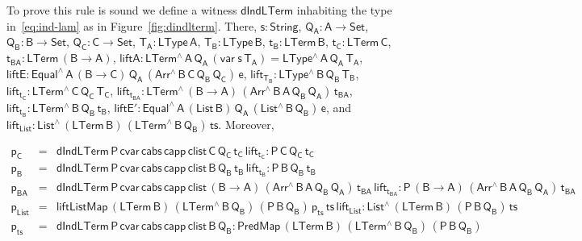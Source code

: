 \documentclass[9pt]{entcs}
\begin{document}
To prove this rule is sound we define a witness
$\mathsf{dIndLTerm}$ inhabiting the type in~\eqref{eq:ind-lam} as in
Figure~\ref{fig:dindlterm}. There, $\mathsf{s : String}$, $\mathsf{Q_A
  : A \to Set}$, $\mathsf{Q_B : B \to Set}$, $\mathsf{Q_C : C \to
  Set}$, $\mathsf{T_A : LType\,A}$, $\mathsf{T_B : LType\,B}$,
$\mathsf{t_B : LTerm\,B}$, $\mathsf{t_C : LTerm\,C}$, $\mathsf{t_{BA}
  : LTerm\,(B \to A)}$, $\mathsf{liftA : LTerm^{\wedge}\, A\,
  Q_A\, (var\;s\,T_A) = LType^{\wedge}\,A\,Q_A\,T_A}$, $\mathsf{liftE
  : Equal^{\wedge} \, A\, (B \to C)\, Q_A\, (Arr^{\wedge} \, B\, C\,
  Q_B \, Q_C) \, e}$, $\mathsf{lift_{T_B}: LType^{\wedge} \, B\, Q_B\,
  T_B}$, $\mathsf{lift_{t_C}: LTerm^{\wedge} \, C\, Q_C\,
  T_C}$, $\mathsf{lift_{t_{BA}}: LTerm^{\wedge} \, (B \to A)\,
  (Arr^{\wedge} \, B\, A\, Q_B \, Q_A)\,
  t_{BA}}$, $\mathsf{lift_{t_B}: LTerm^{\wedge} \, B\, Q_B\,
  t_B}$, $\mathsf{liftE' : Equal^{\wedge}\, A\, (List\,B)\, Q_A\,
  (List^{\wedge}\, B\, Q_B)\, e}$, and $\mathsf{lift_{List}:
  List^{\wedge} \, (LTerm\, B) \, (LTerm^{\wedge}\, B\, Q_B) \, ts}$.
Moreover,

\vspace*{-0.225in}

\[\begin{array}{lll}
\mathsf{p_C} & = & \mathsf{dIndLTerm\,P\,cvar\,cabs \,capp \,clist\,
  C\, Q_C\, t_C\, lift_{t_C} : P \, C\, Q_C \, t_C }\\
\mathsf{p_B} & = & \mathsf{dIndLTerm\,P\,cvar\,cabs \,capp \,clist\,
  B\, Q_B\, t_B\, lift_{t_B} : P \, B\, Q_B \, t_B }\\
\mathsf{p_{BA}} & = & \mathsf{dIndLTerm\,P\,cvar\,cabs \,capp
  \,clist\, (B \to A)\,(Arr^{\wedge} \, B\, A\, Q_B \, Q_A) \,
  t_{BA}\, lift_{t_{BA}} : P \, (B \to A)\, (Arr^{\wedge} \, B\, A\,
  Q_B \, Q_A) \, t_{BA}}\\ 
\mathsf{p_{List}} & = &\mathsf{liftListMap \, (LTerm\, B) \,
  (LTerm^{\wedge} \, B \, Q_B)\, (P\,B\,Q_B)\, p_{ts} \, ts\,
  lift_{List} : List^{\wedge}\, (LTerm\,B) \, (P\,B\,Q_B) \, ts}\\
\mathsf{p_{ts}} & = & \mathsf{dIndLTerm\, P\, cvar\, cabs\, capp\,
  clist\, B\, Q_B : PredMap\,(LTerm\,B) \,(LTerm^{\wedge}\, B\, Q_B)
  \, (P\,B\,Q_B)}
\end{array}\]

\vspace*{-0.1in}
\end{document}
